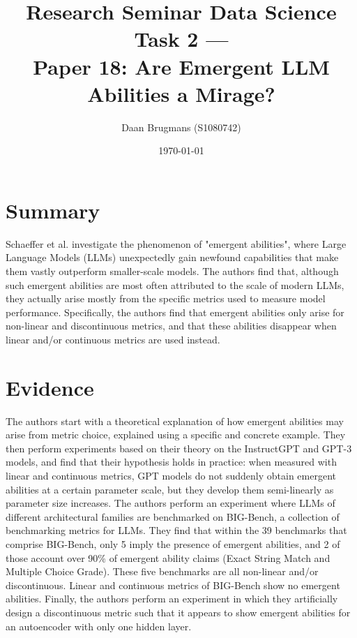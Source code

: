 \documentclass{IEEEtran}
\begin{document}
\title{Research Seminar Data Science Task 2 ---\\Paper 18: Are Emergent LLM Abilities a Mirage?}
\author{Daan Brugmans (S1080742)}
\date{\today}

\maketitle

\section{Summary}
Schaeffer et al. investigate the phenomenon of "emergent abilities", where Large Language Models (LLMs) unexpectedly gain newfound capabilities that make them vastly outperform smaller-scale models.
The authors find that, although such emergent abilities are most often attributed to the scale of modern LLMs, they actually arise mostly from the specific metrics used to measure model performance.
Specifically, the authors find that emergent abilities only arise for non-linear and discontinuous metrics, and that these abilities disappear when linear and/or continuous metrics are used instead.

\section{Evidence}
The authors start with a theoretical explanation of how emergent abilities may arise from metric choice, explained using a specific and concrete example.
They then perform experiments based on their theory on the InstructGPT and GPT-3 models, and find that their hypothesis holds in practice: when measured with linear and continuous metrics, GPT models do not suddenly obtain emergent abilities at a certain parameter scale, but they develop them semi-linearly as parameter size increases.
The authors perform an experiment where LLMs of different architectural families are benchmarked on BIG-Bench, a collection of benchmarking metrics for LLMs.
They find that within the 39 benchmarks that comprise BIG-Bench, only 5 imply the presence of emergent abilities, and 2 of those account over 90\% of emergent ability claims (Exact String Match and Multiple Choice Grade).
These five benchmarks are all non-linear and/or discontinuous.
Linear and continuous metrics of BIG-Bench show no emergent abilities.
Finally, the authors perform an experiment in which they artificially design a discontinuous metric such that it appears to show emergent abilities for an autoencoder with only one hidden layer.
\end{document}
